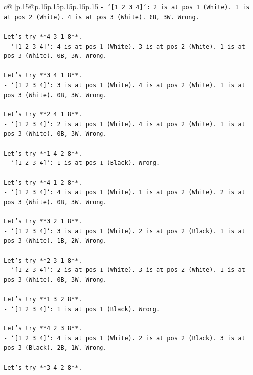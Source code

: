 \documentclass{article}
\begin{document}
{\begin{supertabular}{c@{$\;$}|p{.15\linewidth}@{}p{.15\linewidth}p{.15\linewidth}p{.15\linewidth}p{.15\linewidth}p{.15\linewidth}}
{{{\texttt{{-} `{[}1 2 3 4{]}`: 2 is at pos 1 (White). 1 is at pos 2 (White). 4 is at pos 3 (White). 0B, 3W. Wrong.} \\
\\ 
\texttt{Let's try **4 3 1 8**.} \\
\texttt{{-} `{[}1 2 3 4{]}`: 4 is at pos 1 (White). 3 is at pos 2 (White). 1 is at pos 3 (White). 0B, 3W. Wrong.} \\
\\ 
\texttt{Let's try **3 4 1 8**.} \\
\texttt{{-} `{[}1 2 3 4{]}`: 3 is at pos 1 (White). 4 is at pos 2 (White). 1 is at pos 3 (White). 0B, 3W. Wrong.} \\
\\ 
\texttt{Let's try **2 4 1 8**.} \\
\texttt{{-} `{[}1 2 3 4{]}`: 2 is at pos 1 (White). 4 is at pos 2 (White). 1 is at pos 3 (White). 0B, 3W. Wrong.} \\
\\ 
\texttt{Let's try **1 4 2 8**.} \\
\texttt{{-} `{[}1 2 3 4{]}`: 1 is at pos 1 (Black). Wrong.} \\
\\ 
\texttt{Let's try **4 1 2 8**.} \\
\texttt{{-} `{[}1 2 3 4{]}`: 4 is at pos 1 (White). 1 is at pos 2 (White). 2 is at pos 3 (White). 0B, 3W. Wrong.} \\
\\ 
\texttt{Let's try **3 2 1 8**.} \\
\texttt{{-} `{[}1 2 3 4{]}`: 3 is at pos 1 (White). 2 is at pos 2 (Black). 1 is at pos 3 (White). 1B, 2W. Wrong.} \\
\\ 
\texttt{Let's try **2 3 1 8**.} \\
\texttt{{-} `{[}1 2 3 4{]}`: 2 is at pos 1 (White). 3 is at pos 2 (White). 1 is at pos 3 (White). 0B, 3W. Wrong.} \\
\\ 
\texttt{Let's try **1 3 2 8**.} \\
\texttt{{-} `{[}1 2 3 4{]}`: 1 is at pos 1 (Black). Wrong.} \\
\\ 
\texttt{Let's try **4 2 3 8**.} \\
\texttt{{-} `{[}1 2 3 4{]}`: 4 is at pos 1 (White). 2 is at pos 2 (Black). 3 is at pos 3 (Black). 2B, 1W. Wrong.} \\
\\ 
\texttt{Let's try **3 4 2 8**.} \\
}}}
\end{supertabular}}
\end{document}
